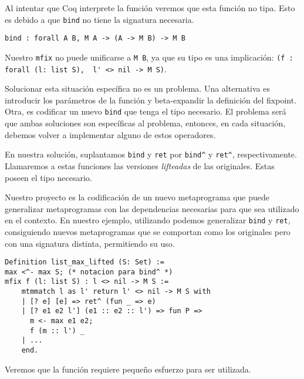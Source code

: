 Al intentar que Coq interprete la función veremos que esta función no tipa.
Esto es debido a que \lstinline{bind} no tiene la signatura necesaria.

\begin{lstlisting}
bind : forall A B, M A -> (A -> M B) -> M B
\end{lstlisting}

Nuestro \lstinline{mfix} no puede unificarse a \lstinline{M B}, ya que su tipo es una implicación: \lstinline{(f : forall (l: list S),  l' <> nil -> M S)}.

Solucionar esta situación específica no es un problema.
Una alternativa es introducir los parámetros de la función y beta-expandir la definición del fixpoint.
Otra, es codificar un nuevo \lstinline{bind} que tenga el tipo necesario.
El problema será que ambas soluciones son específicas al problema, entonces, en cada situación, debemos volver a implementar alguno de estos operadores.

En nuestra solución, suplantamos \lstinline{bind} y \lstinline{ret} por \lstinline{bind^} y \lstinline{ret^}, respectivamente. Llamaremos a estas funciones las versiones \emph{lifteadas} de las originales. Estas poseen el tipo necesario.

Nuestro proyecto es la codificación de un nuevo metaprograma \lift que puede generalizar metaprogramas con las dependencias necesarias para que sea utilizado en el contexto.
En nuestro ejemplo, utilizando \lift podemos generalizar \lstinline{bind} y \lstinline{ret}, consiguiendo nuevos metaprogramas que se comportan como los originales pero con una signatura distinta, permitiendo su uso.

\begin{lstlisting}[frame=tb,caption={Función \lstinline{list_max} lifteada},label=lst:list_max_lifted]
Definition list_max_lifted (S: Set) :=
max <^- max S; (* notacion para bind^ *)
mfix f (l: list S) : l <> nil -> M S :=
    mtmmatch l as l' return l' <> nil -> M S with
    | [? e] [e] => ret^ (fun _ => e)
    | [? e1 e2 l'] (e1 :: e2 :: l') => fun P =>
      m <- max e1 e2;
      f (m :: l') _
    | ...
    end.
\end{lstlisting}

Veremos que la función \lift requiere pequeño esfuerzo para ser utilizada.